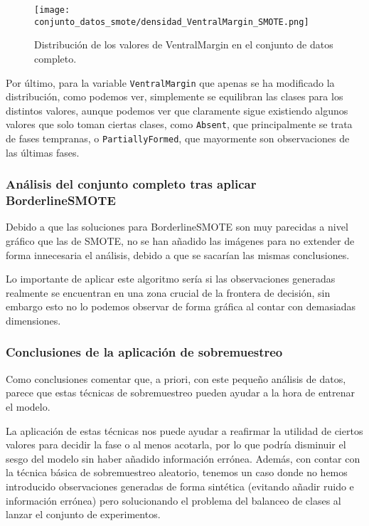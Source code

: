 \begin{figure}[H]
	\centering
	\texttt{[image: conjunto\_datos\_smote/densidad\_VentralMargin\_SMOTE.png]}
	\caption{Distribución de los valores de VentralMargin en el conjunto de datos completo.}
	\label{fig:densidad_VentralMargin_SMOTE}
\end{figure}

Por último, para la variable \texttt{VentralMargin} que apenas se ha modificado la distribución, como podemos ver, simplemente se equilibran las clases para los distintos valores, aunque podemos ver que claramente sigue existiendo algunos valores que solo toman ciertas clases, como \texttt{Absent}, que principalmente se trata de fases tempranas, o \texttt{PartiallyFormed}, que mayormente son observaciones de las últimas fases.

\newpage


\subsubsection{Análisis del conjunto completo tras aplicar BorderlineSMOTE}

Debido a que las soluciones para BorderlineSMOTE son muy parecidas a nivel gráfico que las de SMOTE, no se han añadido las imágenes para no extender de forma innecesaria el análisis, debido a que se sacarían las mismas conclusiones.

Lo importante de aplicar este algoritmo sería si las observaciones generadas realmente se encuentran en una zona crucial de la frontera de decisión, sin embargo esto no lo podemos observar de forma gráfica al contar con demasiadas dimensiones.

\subsubsection{Conclusiones de la aplicación de sobremuestreo}


Como conclusiones comentar que, a priori, con este pequeño análisis de datos, parece que estas técnicas de sobremuestreo pueden ayudar a la hora de entrenar el modelo.

La aplicación de estas técnicas nos puede ayudar a reafirmar la utilidad de ciertos valores para decidir la fase o al menos acotarla, por lo que podría disminuir el sesgo del modelo sin haber añadido información errónea. Además, con contar con la técnica básica de sobremuestreo aleatorio, tenemos un caso donde no hemos introducido observaciones generadas de forma sintética (evitando añadir ruido e información errónea) pero solucionando el problema del balanceo de clases al lanzar el conjunto de experimentos.



\newpage
